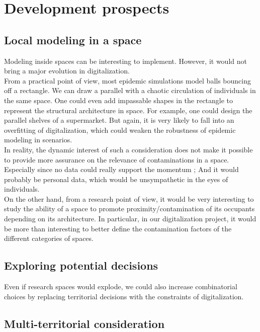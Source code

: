 \chapter{Development prospects}

\section{Local modeling in a space}

Modeling inside spaces can be interesting to implement. However, it would not bring a major evolution in digitalization.\\

From a practical point of view, most epidemic simulations model balls bouncing off a rectangle. We can draw a parallel with a chaotic circulation of individuals in the same space. One could even add impassable shapes in the rectangle to represent the structural architecture in space. For example, one could design the parallel shelves of a supermarket. But again, it is very likely to fall into an overfitting of digitalization, which could weaken the robustness of epidemic modeling in scenarios.\\

In reality, the dynamic interest of such a consideration does not make it possible to provide more assurance on the relevance of contaminations in a space. Especially since no data could really support the momentum ; And it would probably be personal data, which would be unsympathetic in the eyes of individuals.\\

On the other hand, from a research point of view, it would be very interesting to study the ability of a space to promote proximity/contamination of its occupants depending on its architecture. In particular, in our digitalization project, it would be more than interesting to better define the contamination factors of the different categories of spaces.\\

\section{Exploring potential decisions}

Even if research spaces would explode, we could also increase combinatorial choices by replacing territorial decisions with the constraints of digitalization.\\

\section{Multi-territorial consideration}


